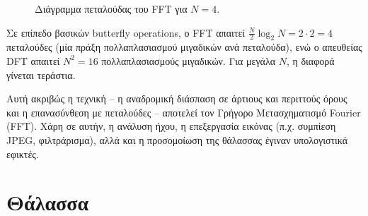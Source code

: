 \begin{figure}[htbp]
\caption{Διάγραμμα πεταλούδας του FFT για $N=4$.}
\label{fig:fft_butterfly_n4}
\end{figure}

Σε επίπεδο βασικών butterfly operations, ο FFT απαιτεί
\(\frac{N}{2} \log_2 N = 2 \cdot 2 = 4\) πεταλούδες (μία πράξη πολλαπλασιασμού μιγαδικών ανά πεταλούδα), ενώ ο
απευθείας DFT απαιτεί \(N^2 = 16\) πολλαπλασιασμούς μιγαδικών. Για
μεγάλα \(N\), η διαφορά γίνεται τεράστια.

Αυτή ακριβώς η τεχνική -- η αναδρομική διάσπαση σε άρτιους και περιττούς
όρους και η επανασύνθεση με πεταλούδες -- αποτελεί τον Γρήγορο
Μετασχηματισμό Fourier (FFT). Χάρη σε αυτήν, η ανάλυση ήχου, η
επεξεργασία εικόνας (π.χ. συμπίεση JPEG, φιλτράρισμα), αλλά και η
προσομοίωση της θάλασσας έγιναν υπολογιστικά εφικτές.

\section{Θάλασσα}\label{ux3b8ux3acux3bbux3b1ux3c3ux3c3ux3b1}

